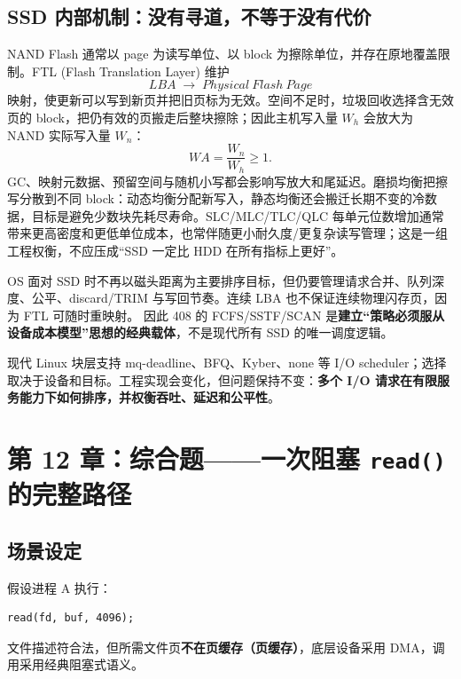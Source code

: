 \documentclass[UTF8,fontset=fandol,11pt,a4paper]{ctexart}
\newcommand{\kw}[1]{\textbf{#1}}
\newcommand{\code}[1]{\texttt{#1}}
\newcommand{\arr}{\;\longrightarrow\;}
\begin{document}
\subsection{SSD 内部机制：没有寻道，不等于没有代价}
NAND Flash 通常以 page 为读写单位、以 block 为擦除单位，并存在原地覆盖限制。FTL (Flash Translation Layer) 维护
\[
\boxed{LBA\arr Physical\ Flash\ Page}
\]
映射，使更新可以写到新页并把旧页标为无效。空间不足时，垃圾回收选择含无效页的 block，把仍有效的页搬走后整块擦除；因此主机写入量 $W_h$ 会放大为 NAND 实际写入量 $W_n$：
\[
\boxed{WA=\frac{W_n}{W_h}\ge1}.
\]
GC、映射元数据、预留空间与随机小写都会影响写放大和尾延迟。磨损均衡把擦写分散到不同 block：动态均衡分配新写入，静态均衡还会搬迁长期不变的冷数据，目标是避免少数块先耗尽寿命。SLC/MLC/TLC/QLC 每单元位数增加通常带来更高密度和更低单位成本，也常伴随更小耐久度/更复杂读写管理；这是一组工程权衡，不应压成“SSD 一定比 HDD 在所有指标上更好”。

OS 面对 SSD 时不再以磁头距离为主要排序目标，但仍要管理请求合并、队列深度、公平、discard/TRIM 与写回节奏。连续 LBA 也不保证连续物理闪存页，因为 FTL 可随时重映射。
因此 408 的 FCFS/SSTF/SCAN 是\kw{建立“策略必须服从设备成本模型”思想的经典载体}，不是现代所有 SSD 的唯一调度逻辑。

\begin{eng}
现代 Linux 块层支持 mq-deadline、BFQ、Kyber、none 等 I/O scheduler；选择取决于设备和目标。工程实现会变化，但问题保持不变：\kw{多个 I/O 请求在有限服务能力下如何排序，并权衡吞吐、延迟和公平性}。
\end{eng}

\section{第 12 章：综合题——一次阻塞 \texorpdfstring{\code{read()}}{read()} 的完整路径}

\subsection{场景设定}
假设进程 A 执行：
\begin{lstlisting}
read(fd, buf, 4096);
\end{lstlisting}
文件描述符合法，但所需文件页\kw{不在页缓存（页缓存）}，底层设备采用 DMA，调用采用经典阻塞式语义。
\end{document}
